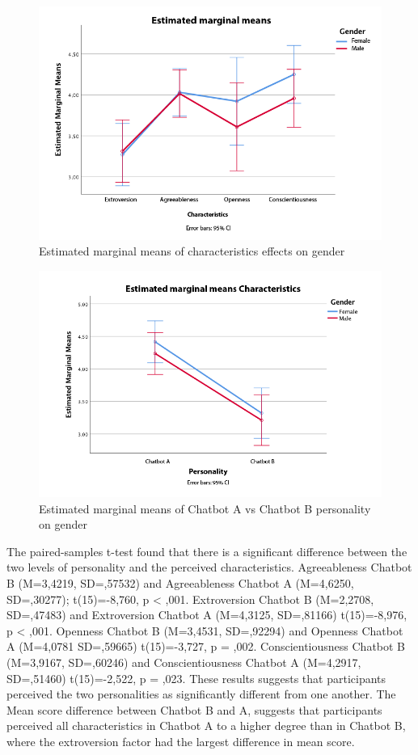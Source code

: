 \begin{figure}[h]
    \centering
    \includegraphics[scale=0.4]{figures/char-gender.png}
    \caption{Estimated marginal means of characteristics effects on gender}
    \label{fig:chargend}
\end{figure}

\begin{figure}[h]
    \centering
    \includegraphics[scale=0.4]{figures/pers-char-gender.png}
    \caption{Estimated marginal means of Chatbot A vs Chatbot B personality on gender}
    \label{fig:perschargender}
\end{figure}

The paired-samples t-test found that there is a significant difference between the two levels of personality and the perceived characteristics. Agreeableness Chatbot B (M=3,4219, SD=,57532) and Agreeableness Chatbot A (M=4,6250, SD=,30277); t(15)=-8,760, p < ,001. Extroversion Chatbot B (M=2,2708, SD=,47483) and Extroversion Chatbot A (M=4,3125, SD=,81166) t(15)=-8,976, p < ,001. Openness Chatbot B (M=3,4531, SD=,92294) and Openness Chatbot A (M=4,0781 SD=,59665) t(15)=-3,727, p = ,002. Conscientiousness Chatbot B (M=3,9167, SD=,60246) and Conscientiousness Chatbot A (M=4,2917, SD=,51460) t(15)=-2,522, p = ,023. These results suggests that participants perceived the two personalities as significantly different from one another. The Mean score difference between Chatbot B and A, suggests that participants perceived all characteristics in Chatbot A to a higher degree than in Chatbot B, where the extroversion factor had the largest difference in mean score.

